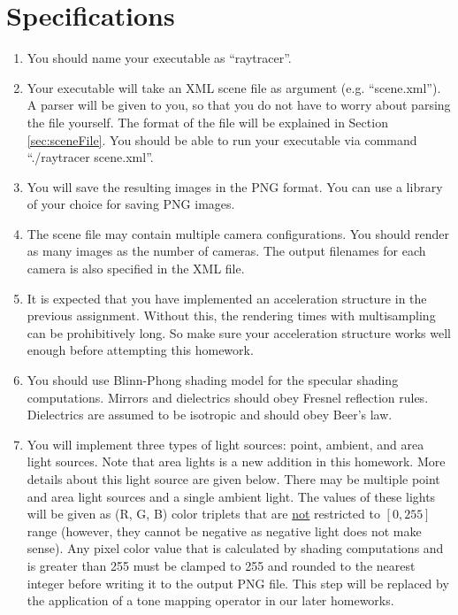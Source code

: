 \documentclass[12pt]{article}
\begin{document}
\section{Specifications}
\begin{enumerate}

\item \textbf{}You should name your executable as ``raytracer''.

\item \textbf{}Your executable will take an XML scene file as argument
(e.g. ``scene.xml''). A parser will be given to you, so that you do not
have to worry about parsing the file yourself. The format of the file
will be explained in Section \ref{sec:sceneFile}. You should be able to
run your executable via command  ``./raytracer scene.xml''.

\item \textbf{}You will save the resulting images in the PNG format. You
can use a library of your choice for saving PNG images.

\item \textbf{}The scene file may contain multiple camera
configurations. You should render as many images as the number of
cameras. The output filenames for each camera is also specified in the
XML file.

\item \textbf{}It is expected that you have implemented an acceleration
structure in the previous assignment. Without this, the rendering times
with multisampling can be prohibitively long. So make sure your
acceleration structure works well enough before attempting this
homework.

\item \textbf{}You should use Blinn-Phong shading model for the specular
shading computations.  Mirrors and dielectrics should obey Fresnel
reflection rules.  Dielectrics are assumed to be isotropic and should
obey Beer's law.

\item \textbf{}You will implement three types of light sources: point,
ambient, and area light sources. Note that area lights is a new addition
in this homework. More details about this light source are given below.
There may be multiple point and area light sources and a single ambient
light. The values of these lights will be given as (R, G, B) color
triplets that are \underline{not} restricted to $[0, 255]$ range (however,
        they cannot be negative as negative light does not make sense).
Any pixel color value that is calculated by shading computations and is
greater than 255 must be clamped to 255 and rounded to the nearest
integer before writing it to the output PNG file. This step will be
replaced by the application of a tone mapping operator in our later
homeworks.


\end{enumerate}
\end{document}
